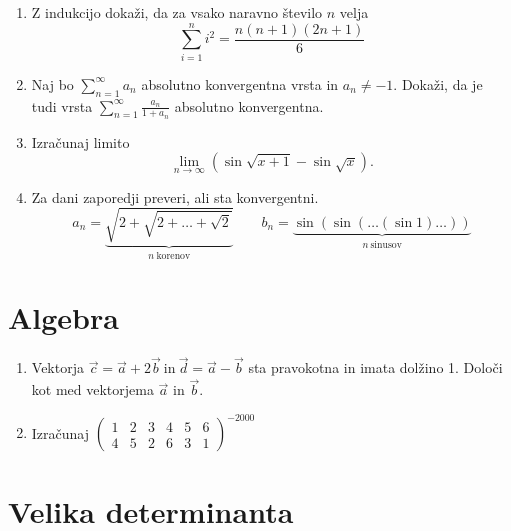 \documentclass[a4paper,12pt]{article}
\begin{document}
\begin{enumerate}
\item
Z indukcijo dokaži, da za vsako naravno število \(n\) velja
\[\sum_{i=1}^{n}i^2=\frac{n(n+1)(2n+1)}{6}\]

\item
Naj bo \(\sum_{n=1}^{\infty}a_n\) absolutno konvergentna vrsta in \(a_n \ne -1\).
Dokaži, da je tudi vrsta \(\sum_{n=1}^\infty \frac{a_n}{1+a_n}\)
absolutno konvergentna.

\item
Izračunaj limito
\[\lim_{n\rightarrow \infty}(\sin \sqrt{x+1}-\sin \sqrt{x}).\]

\item
Za dani zaporedji preveri, ali sta konvergentni.
\[a_n = \underbrace{\sqrt{2+\sqrt{2+\dots+\sqrt{2}}}}_{n~\text{korenov}} \qquad
b_n = \underbrace{\sin(\sin(\dots(\sin 1)\dots))}_{n~\text{sinusov}}\]

\end{enumerate}

\section*{Algebra}

\begin{enumerate}
\item
Vektorja \(\vec{c}=\vec{a}+2\vec{b}~\text{in}~\vec{d}=\vec{a}-\vec{b}\)
sta pravokotna in imata dolžino 1. Določi kot med vektorjema \(\vec{a}\) in \(\vec{b}\).

\item
Izračunaj
\(
\begin{pmatrix}
    1 & 2 & 3 & 4 & 5 & 6\\
    4 & 5 & 2 & 6 & 3 & 1  
\end{pmatrix}^{-2000} 
\)
\end{enumerate}

\section*{Velika determinanta}
\end{document}
